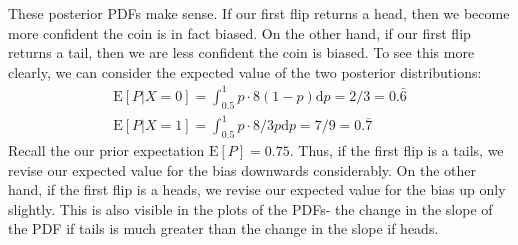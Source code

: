 \documentclass[paper=a4, fontsize=11pt]{scrartcl} %
\numberwithin{equation}{section} %
\numberwithin{figure}{section} %
\numberwithin{table}{section} %
\begin{document}
These posterior PDFs make sense. If our first flip returns a head, then we become more confident  the coin is in fact biased. On the other hand, if our first flip returns a tail, then we are less confident the coin is biased. To see this more clearly, we can consider the expected value of the two posterior distributions:
\begin{align*}
\textrm{E}[P | X = 0] = \int_{0.5}^1 p \cdot 8(1-p) \textrm{d}p = 2/3 = 0.\bar{6}\\
\textrm{E}[P | X = 1] = \int_{0.5}^1 p \cdot 8/3 p \textrm{d}p = 7/9 = 0.\bar{7}
\end{align*}
Recall the our prior expectation $\textrm{E}[P] = 0.75$. Thus, if the first flip is a tails, we revise our expected value for the bias downwards considerably. On the other hand, if the first flip is a heads, we revise our expected value for the bias up only slightly. This is also visible in the plots of the PDFs- the change in the slope of the PDF if tails is much greater than the change in the slope if heads.

\end{document}
